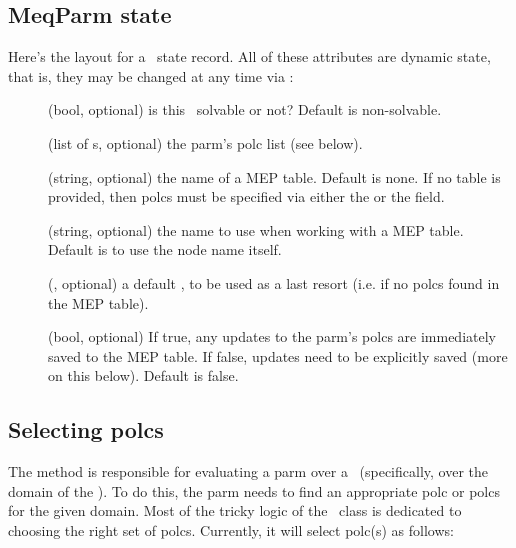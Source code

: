 \subsection{MeqParm state}

  Here's the layout for a \Parm\ state record. All of these attributes are
  dynamic state, that is, they may be changed at any time via :
  
  \begin{description}

  \item[] (bool, optional) is this \Parm\ solvable or not?
    Default is non-solvable.

  \item[] (list of \Polc{}s, optional) the parm's polc list (see below).

  \item[] (string, optional) the name of a MEP table. Default is none.
    If no table is provided, then polcs must be specified via either the
     or the  field.

  \item[] (string, optional) the name to use when working with a MEP
    table. Default is to use the node name itself.

  \item[] (\Polc, optional) a default \Polc, to be used as a last
    resort (i.e. if no polcs found in the MEP table).

  \item[] (bool, optional) If true, any updates to the parm's 
    polcs are immediately saved to the MEP table. If false, updates need to be
    explicitly saved (more on this below). Default is false.

  \end{description}
  
\subsection{Selecting polcs}

  The  method is responsible for evaluating a parm over a
  \Cells\ (specifically, over the domain of the \Cells). To do this, the parm
  needs to find an appropriate polc or polcs for the given domain. Most of the
  tricky logic of the \Parm\ class is dedicated to choosing the right set of
  polcs.  Currently, it will select polc(s) as follows:

